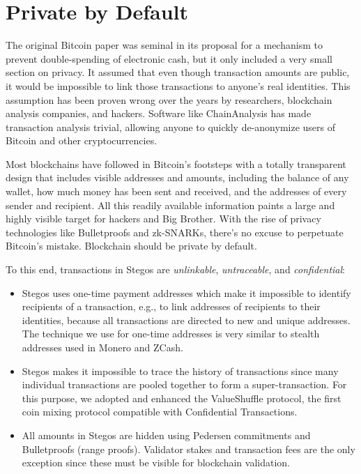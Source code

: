 \documentclass[8pt,fleqn,openany]{book}
\begin{document}

\section{Private by Default}
The original Bitcoin paper was seminal in its proposal for a mechanism to prevent double-spending of electronic cash, but it only included a very small section on privacy\cite{c1}. It assumed that even though transaction amounts are public, it would be impossible to link those transactions to anyone’s real identities. This assumption has been proven wrong over the years by researchers, blockchain analysis companies, and hackers. Software like ChainAnalysis has made transaction analysis trivial, allowing anyone to quickly de-anonymize users of Bitcoin and other cryptocurrencies.

Most blockchains have followed in Bitcoin’s footsteps with a totally transparent design that includes visible addresses and amounts, including the balance of any wallet, how much money has been sent and received, and the addresses of every sender and recipient. All this readily available information paints a large and highly visible target for hackers and Big Brother. With the rise of privacy technologies like Bulletproofs and zk-SNARKs, there’s no excuse to perpetuate Bitcoin’s mistake. Blockchain should be private by default.

To this end, transactions in Stegos are \textit{unlinkable}, \textit{untraceable}, and \textit{confidential}:

\begin{itemize}
	\item Stegos uses one-time payment addresses which make it impossible to identify recipients of a transaction, e.g., to link addresses of recipients to their identities, because all transactions are directed to new and unique addresses. The technique we use for one-time addresses is very similar to stealth addresses used in Monero and ZCash.
	\item Stegos makes it impossible to trace the history of transactions since many individual transactions are pooled together to form a super-transaction. For this purpose, we adopted and enhanced the ValueShuffle protocol\cite{c7}, the first coin mixing protocol compatible with Confidential Transactions.
	\item All amounts in Stegos are hidden using Pedersen commitments\cite{c8} and Bulletproofs (range proofs)\cite{c4}. Validator stakes and transaction fees are the only exception since these must be visible for blockchain validation.\end{itemize}
\end{document}
